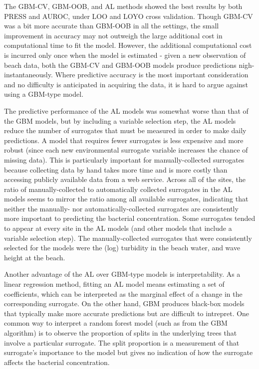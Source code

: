 \documentclass[authoryear,review, 12pt]{elsarticle}
\begin{document}
The GBM-CV, GBM-OOB, and AL methods showed the best results by both
PRESS and AUROC, under LOO and LOYO cross validation. Though GBM-CV was
a bit more accurate than GBM-OOB in all the settings, the small
improvement in accuracy may not outweigh the large additional cost in
computational time to fit the model. However, the additional
computational cost is incurred only once when the model is estimated -
given a new observation of beach data, both the GBM-CV and GBM-OOB
models produce predictions nigh-instantaneously. Where predictive
accuracy is the most important consideration and no difficulty is
anticipated in acquiring the data, it is hard to argue against using a
GBM-type model.

The predictive performance of the AL models was somewhat worse than that
of the GBM models, but by including a variable selection step, the AL
models reduce the number of surrogates that must be measured in order to
make daily predictions. A model that requires fewer surrogates is less
expensive and more robust (since each new environmental surrogate variable increases the chance of missing data). This is
particularly important for manually-collected surrogates because
collecting data by hand takes more time and is more costly than
accessing publicly available data from a web service. Across all of
the sites, the ratio of manually-collected to automatically collected
surrogates in the AL models seems to mirror the ratio among all
available surrogates, indicating that neither the manually- nor
automatically-collected surrogates are consistently more important to
predicting the bacterial concentration. Some surrogates tended to appear
at every site in the AL models (and other models that include a
variable selection step). The manually-collected surrogates that were
consistently selected for the models were the (log) turbidity in the
beach water, and wave height at the beach.

Another advantage of the AL over GBM-type models is interpretability. As
a linear regression method, fitting an AL model means estimating a
set of coefficients, which can be interpreted as the marginal effect of
a change in the corresponding surrogate. On the other hand, GBM produces
black-box models that typically make more accurate predictions but are
difficult to intrepret. One common way to interpret a random forest
model (such as from the GBM algorithm) is to observe the proportion of
splits in the underlying trees that involve a particular surrogate. The
split proportion is a measurement of that surrogate's importance to the
model but gives no indication of how the surrogate affects the
bacterial concentration.
\end{document}
